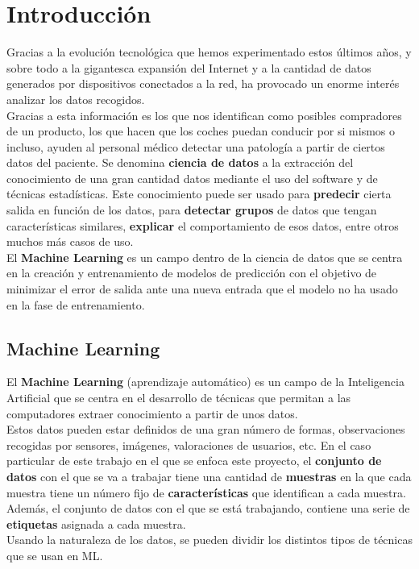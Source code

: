 \chapter{Introducción}
Gracias a la evolución tecnológica que hemos experimentado estos últimos años, y sobre todo a la gigantesca expansión del Internet y a la cantidad de datos generados por dispositivos conectados a la red, ha provocado un enorme interés analizar los datos recogidos.\\
Gracias a esta información es los que nos identifican como posibles compradores de un producto, los que hacen que los coches puedan conducir por si mismos o incluso, ayuden al personal médico detectar una patología a partir de ciertos datos del paciente.
\linebreak
Se denomina \textbf{ciencia de datos} a la extracción del conocimiento de una gran cantidad datos mediante el uso del software y de técnicas estadísticas. Este conocimiento puede ser usado para \textbf{predecir} cierta salida en función de los datos, para \textbf{detectar grupos} de datos que tengan características similares, \textbf{explicar} el comportamiento de esos datos, entre otros muchos más casos de uso. \\
\linebreak
El \textbf{Machine Learning} es un campo dentro de la ciencia de datos que se centra en la creación y entrenamiento de modelos de predicción con el objetivo de minimizar el error de salida ante una nueva entrada que el modelo no ha usado en la fase de entrenamiento.
\section{Machine Learning}
El \textbf{Machine Learning} (aprendizaje automático) es un campo de la Inteligencia Artificial que se centra en el desarrollo de técnicas que permitan a las computadores extraer conocimiento a partir de unos datos.\\
\linebreak
Estos datos pueden estar definidos de una gran número de formas, observaciones recogidas por sensores, imágenes, valoraciones de usuarios, etc. En el caso particular de este trabajo en el que se enfoca este proyecto, el \textbf{conjunto de datos} con el que se va a trabajar tiene una cantidad de \textbf{muestras} en la que cada muestra tiene un número fijo de \textbf{características} que identifican a cada muestra. Además, el conjunto de datos con el que se está trabajando, contiene una serie de \textbf{etiquetas} asignada a cada muestra.\\
\linebreak
 Usando la naturaleza de los datos, se pueden dividir los distintos tipos de técnicas que se usan en ML.

